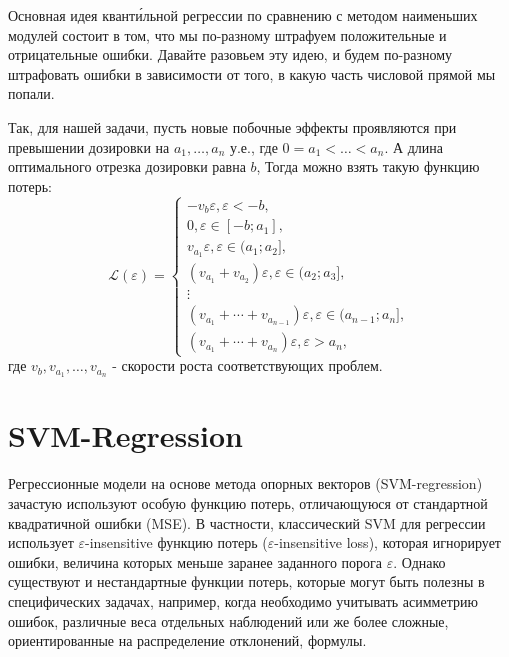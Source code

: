 \begin{solution}
    Основная идея квант\'{и}льной регрессии по сравнению с методом наименьших модулей состоит в том, что мы по-разному штрафуем положительные и отрицательные ошибки. Давайте разовьем эту идею, и будем по-разному штрафовать ошибки в зависимости от того, в какую часть числовой прямой мы попали.

    Так, для нашей задачи, пусть новые побочные эффекты проявляются при превышении дозировки на $a_1, \dotsc, a_n$ у.е., где $0= a_1 < \ldots < a_n$. А длина оптимального отрезка дозировки равна $b$, Тогда можно взять такую функцию потерь:
    $$\mathscr{L}(\varepsilon) = \begin{cases}
            -v_b\varepsilon, \varepsilon < -b,                                             \\
            0, \varepsilon \in [-b; a_1],                                                  \\
            v_{a_1}\varepsilon, \varepsilon \in (a_1; a_2],                                \\
            (v_{a_1} + v_{a_2})\varepsilon, \varepsilon \in (a_2; a_3],                    \\
            \vdots                                                                         \\
            (v_{a_1} + \dotsb + v_{a_{n - 1}})\varepsilon, \varepsilon \in (a_{n-1}; a_n], \\
            (v_{a_1} + \dotsb + v_{a_n})\varepsilon, \varepsilon > a_n,
        \end{cases}$$
    где $v_b, v_{a_1}, \dotsc, v_{a_n}$ - скорости роста соответствующих проблем.
\end{solution}

\newpage
\section*{SVM-Regression}

Регрессионные модели на основе метода опорных векторов (SVM-regression) зачастую используют особую функцию потерь, отличающуюся от стандартной квадратичной ошибки (MSE). В частности, классический SVM для регрессии использует \(\varepsilon\)-insensitive функцию потерь (\(\varepsilon\)-insensitive loss), которая игнорирует ошибки, величина которых меньше заранее заданного порога \(\varepsilon\). Однако существуют и нестандартные функции потерь, которые могут быть полезны в специфических задачах, например, когда необходимо учитывать асимметрию ошибок, различные веса отдельных наблюдений или же более сложные, ориентированные на распределение отклонений, формулы.

